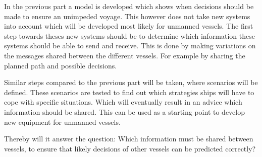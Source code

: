 In the previous part a model is developed which shows when decisions should be made to ensure an unimpeded voyage. This however does not take new systems into account which will be developed most likely for unmanned vessels. The first step towards theses new systems should be to determine which information these systems should be able to send and receive. This is done by making variations on the messages shared between the different vessels. For example by sharing the planned path and possible decisions.

Similar steps compared to the previous part will be taken, where scenarios will be defined. These scenarios are tested to find out which strategies ships will have to cope with specific situations. Which will eventually result in an advice which information should be shared. This can be used as a starting point to develop new equipment for unmanned vessels.

Thereby will it answer the question: Which information must be shared between vessels, to ensure that likely decisions of other vessels can be predicted correctly?